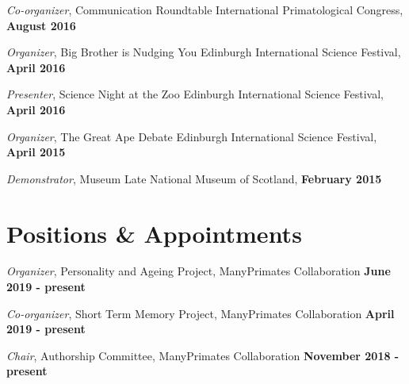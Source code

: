 \documentclass[margin,line]{res}
\begin{document}
\begin{resume}
\vspace{-.2cm}
{\em Co-organizer}, Communication Roundtable \hfill International Primatological Congress,  {\bf August 2016}\\
\vspace{-.5cm}

\vspace{-.2cm}
{\em Organizer}, Big Brother is Nudging You \hfill  Edinburgh International Science Festival,  {\bf April 2016}\\
\vspace{-.5cm}

\vspace{-.2cm}
{\em Presenter}, Science Night at the Zoo \hfill  Edinburgh International Science Festival,  {\bf April 2016}\\
\vspace{-.5cm}

\vspace{-.2cm}
{\em Organizer}, The Great Ape Debate \hfill  Edinburgh International Science Festival,  {\bf April 2015}\\
\vspace{-.5cm}

\vspace{-.2cm}
{\em Demonstrator}, Museum Late  \hfill  National Museum of Scotland,  {\bf February 2015}\\
\vspace{-.5cm}


\vspace{1cm}

\section{\sc Positions \& Appointments} 

\vspace{-.2cm}
{\em Organizer}, Personality and Ageing Project, ManyPrimates Collaboration \hfill   {\bf June 2019 - present}\\
\vspace{-.5cm}

\vspace{-.2cm}
{\em Co-organizer}, Short Term Memory Project, ManyPrimates Collaboration \hfill   {\bf April 2019 - present}\\
\vspace{-.5cm}

\vspace{-.2cm}
{\em Chair}, Authorship Committee, ManyPrimates Collaboration \hfill   {\bf November 2018 - present}\\
\vspace{-.5cm}


\end{resume}
\end{document}
